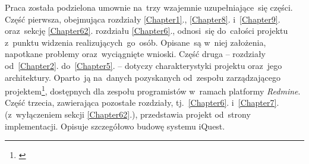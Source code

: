 Praca została podzielona umownie na~trzy wzajemnie uzupełniające~się części. Część pierwsza, obejmująca rozdziały \ref{Chapter1}., \ref{Chapter8}. i~\ref{Chapter9}. oraz~sekcję \ref{Chapter62}. rozdziału \ref{Chapter6}., odnosi~się do~całości projektu z~punktu widzenia realizujących~go~osób. Opisane~są w~niej założenia, napotkane problemy oraz~wyciągnięte wnioski. Część druga -- rozdziały od~\ref{Chapter2}. do~\ref{Chapter5}. -- dotyczy charakterystyki projektu oraz~jego architektury. Oparto~ją na~danych pozyskanych od~zespołu zarządzającego projektem\footnote{\cite{Redmine:ProjDocs}}, dostępnych dla zespołu programistów w~ramach platformy \textit{Redmine}. Część trzecia, zawierająca pozostałe rozdziały, tj.~\ref{Chapter6}. i~\ref{Chapter7}. (z~wyłączeniem sekcji \ref{Chapter62}.), przedstawia projekt od~strony implementacji. Opisuje szczegółowo budowę systemu iQuest.